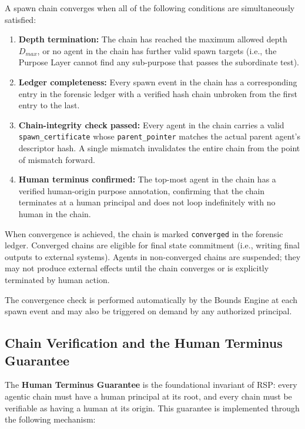 A spawn chain converges when all of the following conditions are simultaneously satisfied:

\begin{enumerate}
\item \textbf{Depth termination:} The chain has reached the maximum allowed depth $D_{max}$, or no agent in the chain has further valid spawn targets (i.e., the Purpose Layer cannot find any sub-purpose that passes the subordinate test).
\item \textbf{Ledger completeness:} Every spawn event in the chain has a corresponding entry in the forensic ledger with a verified hash chain unbroken from the first entry to the last.
\item \textbf{Chain-integrity check passed:} Every agent in the chain carries a valid \texttt{spawn\_certificate} whose \texttt{parent\_pointer} matches the actual parent agent's descriptor hash. A single mismatch invalidates the entire chain from the point of mismatch forward.
\item \textbf{Human terminus confirmed:} The top-most agent in the chain has a verified human-origin purpose annotation, confirming that the chain terminates at a human principal and does not loop indefinitely with no human in the chain.
\end{enumerate}

When convergence is achieved, the chain is marked \texttt{converged} in the forensic ledger. Converged chains are eligible for final state commitment (i.e., writing final outputs to external systems). Agents in non-converged chains are suspended; they may not produce external effects until the chain converges or is explicitly terminated by human action.

The convergence check is performed automatically by the Bounds Engine at each spawn event and may also be triggered on demand by any authorized principal.

\subsection{Chain Verification and the Human Terminus Guarantee}

The \textbf{Human Terminus Guarantee} is the foundational invariant of RSP: every agentic chain must have a human principal at its root, and every chain must be verifiable as having a human at its origin. This guarantee is implemented through the following mechanism:

